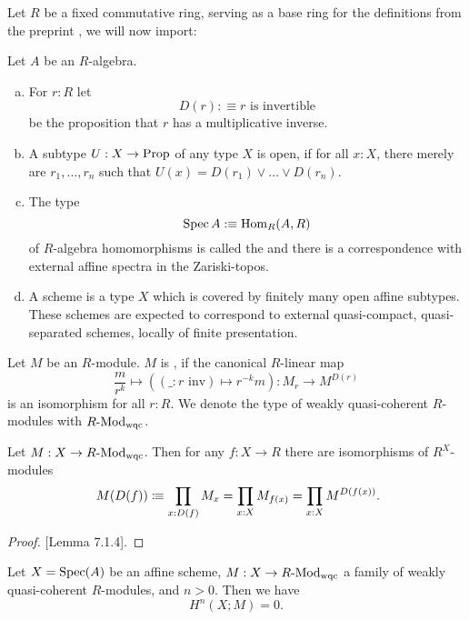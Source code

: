 
Let $R$ be a fixed commutative ring,
serving as a base ring for the definitions from the preprint \cite{draft},
we will now import:

\begin{definition}
  Let $A$ be an $R$-algebra.
  \begin{enumerate}[(a)]
  \item For $r:R$ let
    \[
      D(r):\equiv \text{$r$ is invertible}
    \]
    be the proposition that $r$ has a multiplicative inverse.
  \item A subtype $U:X\to \mathrm{Prop}$ of any type $X$ is open,
    if for all $x:X$, there merely are $r_1,\dots,r_n$ such that $U(x)=D(r_1)\vee \dots \vee D(r_n)$.
  \item The type
    \[
      \operatorname{Spec} A :\equiv \mathrm{Hom}_{R}(A,R)
    \]
    of $R$-algebra homomorphisms is called the 
    and there is a correspondence with external affine spectra in the Zariski-topos.
  \item A scheme is a type $X$ which is covered by finitely many open affine subtypes.
    These schemes are expected to correspond to
    external quasi-compact, quasi-separated schemes, locally of finite presentation.
  \end{enumerate}
\end{definition}

\begin{definition}
  Let $M$ be an $R$-module.
  $M$ is , if the canonical $R$-linear map
  \[
    \frac{m}{r^k}\mapsto ((\_: r\text{ inv})\mapsto r^{-k}m):M_r\to M^{D(r)}
  \]
  is an isomorphism for all $r:R$.
  We denote the type of weakly quasi-coherent $R$-modules with $R\text{-}\mathrm{Mod}_{\text{wqc}}$.
\end{definition}

\begin{remark}
  Let $M:X\to R\text{-}\mathrm{Mod}_{\mathrm{wqc}}$.
  Then for any $f:X\to R$ there are isomorphisms of $R^X$-modules
  \[
  M(D(f))\colonequiv \prod_{x:D(f)}M_x  = \prod_{x:X}M_{f(x)} = \prod_{x:X}M^{D(f(x))}
  \rlap{.}
  \]
\end{remark}

\begin{proof}
  \cite{draft}[Lemma 7.1.4].
\end{proof}

\begin{theorem}
  \label{affine-vanishing}
Let $X = \operatorname{Spec}(A)$ be an affine scheme, 
$M : X \to R\text{-}\mathrm{Mod}_{\text{wqc}}$ a family of weakly quasi-coherent $R$-modules,
and $n > 0$.
Then we have
	\[
		H^n(X;M) = 0.
		\]
\end{theorem}

